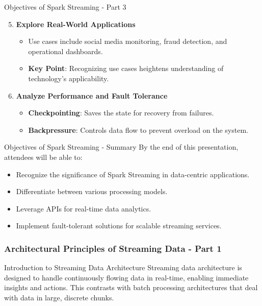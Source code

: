 \documentclass[aspectratio=169]{beamer}
\begin{document}
\begin{frame}[fragile]{Objectives of Spark Streaming - Part 3}
    \begin{enumerate}
        \setcounter{enumi}{4}
        \item \textbf{Explore Real-World Applications}
        \begin{itemize}
            \item Use cases include social media monitoring, fraud detection, and operational dashboards.
            \item \textbf{Key Point}: Recognizing use cases heightens understanding of technology's applicability.
        \end{itemize}
        
        \item \textbf{Analyze Performance and Fault Tolerance}
        \begin{itemize}
            \item \textbf{Checkpointing}: Saves the state for recovery from failures.
            \item \textbf{Backpressure}: Controls data flow to prevent overload on the system.
        \end{itemize}
    \end{enumerate}
\end{frame}

\begin{frame}[fragile]{Objectives of Spark Streaming - Summary}
    By the end of this presentation, attendees will be able to:
    \begin{itemize}
        \item Recognize the significance of Spark Streaming in data-centric applications.
        \item Differentiate between various processing models.
        \item Leverage APIs for real-time data analytics.
        \item Implement fault-tolerant solutions for scalable streaming services.
    \end{itemize}
\end{frame}

\begin{frame}[fragile]
    \frametitle{Architectural Principles of Streaming Data - Part 1}
    \begin{block}{Introduction to Streaming Data Architecture}
        Streaming data architecture is designed to handle continuously flowing data in real-time, enabling immediate insights and actions. This contrasts with batch processing architectures that deal with data in large, discrete chunks.
    \end{block}
\end{frame}
\end{document}

